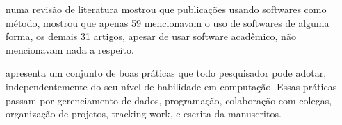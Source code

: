 numa revisão de literatura mostrou que publicações usando softwares como
método, mostrou que apenas 59 mencionavam o uso de softwares de alguma forma,
os demais 31 artigos, apesar de usar software acadêmico, não mencionavam nada a
respeito.

 apresenta um conjunto de boas práticas que todo
pesquisador pode adotar, independentemente do seu nível de habilidade em
computação. Essas práticas passam por gerenciamento de dados, programação,
colaboração com colegas, organização de projetos, tracking work, e escrita da
manuscritos.



